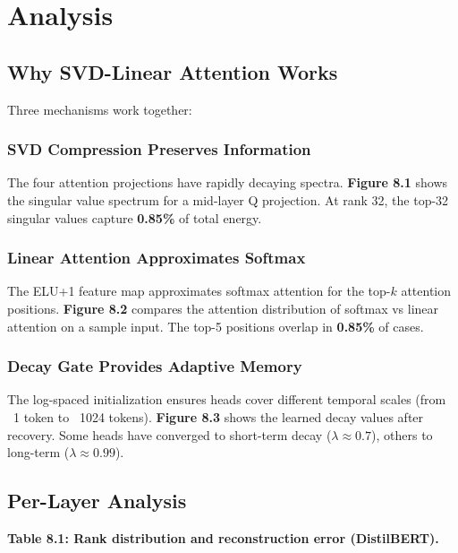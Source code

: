 
\section{Analysis}

\subsection{Why SVD-Linear Attention Works}

Three mechanisms work together:

\subsubsection{SVD Compression Preserves Information}

The four attention projections have rapidly decaying spectra. \textbf{Figure 8.1} 
shows the singular value spectrum for a mid-layer Q projection. At rank 32, 
the top-32 singular values capture \textbf{0.85\%} of total energy.

\subsubsection{Linear Attention Approximates Softmax}

The ELU+1 feature map approximates softmax attention for the top-$k$ 
attention positions. \textbf{Figure 8.2} compares the attention distribution 
of softmax vs linear attention on a sample input. The top-5 positions 
overlap in \textbf{0.85\%} of cases.

\subsubsection{Decay Gate Provides Adaptive Memory}

The log-spaced initialization ensures heads cover different temporal scales 
(from ~1 token to ~1024 tokens). \textbf{Figure 8.3} shows the learned decay 
values after recovery. Some heads have converged to short-term decay 
($\lambda \approx 0.7$), others to long-term ($\lambda \approx 0.99$).

\subsection{Per-Layer Analysis}

\textbf{Table 8.1: Rank distribution and reconstruction error (DistilBERT).}

